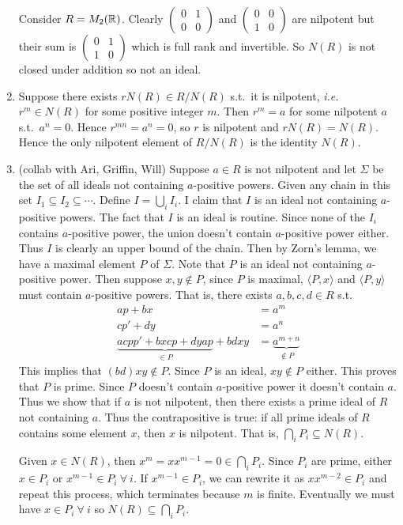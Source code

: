 \documentclass[12pt]{article}
\begin{document}
\begin{problem}[2]
\begin{enumerate}[label=(\alph*)]
	Consider $ R = M_2(\mathbb{R})$. Clearly $ \begin{pmatrix} 0&1\\0&0 \end{pmatrix} $ and $ \begin{pmatrix} 0&0\\1&0 \end{pmatrix} $ are nilpotent but their sum is $ \begin{pmatrix} 0&1\\1&0 \end{pmatrix} $ which is full rank and invertible. So $ N(R)$ is not closed under addition so not an ideal.
\item Suppose there exists $ rN(R) \in R /N(R)$ s.t.\ it is nilpotent,  \emph{i.e.} $ r^{m} \in N(R)$ for some positive integer $ m$. Then $ r^{m} = a$ for some nilpotent $ a$  s.t.\ $ a^{n}=0$. Hence $ r^{mn} = a^{n} = 0$, so $ r$ is nilpotent and  $ rN(R) = N(R)$. Hence the only nilpotent element of  $ R /N(R)$ is the identity  $ N(R)$.
\item (collab with Ari, Griffin, Will) Suppose $ a \in R$ is not nilpotent and let $ \Sigma$ be the set of all ideals not containing $ a$-positive powers. Given any chain in this set $ I_1 \subseteq I_2 \subseteq \cdots$. Define $ I = \bigcup_{ i} I_i$. I claim that $ I$ is an ideal not containing  $ a$-positive powers. The fact that $ I$ is an ideal is routine. Since none of the  $ I_i$ contains $ a$-positive power, the union doesn't contain  $ a$-positive power either. Thus  $ I$ is clearly an upper bound of the chain. Then by Zorn's lemma, we have a maximal element $ P$ of $ \Sigma$. Note that $ P$ is an ideal not containing $ a$-positive power. Then suppose  $ x,y \not\in P$, since $ P$ is maximal,  $ \langle P,x \rangle$ and $ \langle P,y \rangle$ must contain $ a$-positive powers. That is, there exists  $ a,b,c,d \in R$ s.t.\ 
	\begin{align*}
		ap+bx &= a^{m}\\
		cp'+dy &= a^{n} \\
		\underbrace{ acpp'+bxcp+dyap}_{ \in P} + bdxy &= \underbrace{ a^{m+n} }_{ \not\in P} 
	\end{align*}
	This implies that $ (bd)xy \not\in P$. Since $ P$ is an ideal,  $xy \not\in P $ either. This proves that $ P$ is prime. Since $ P$ doesn't contain  $ a$-positive power it doesn't contain  $ a$. Thus we show that if $ a$ is not nilpotent, then there exists a prime ideal of $ R$ not containing $ a$. Thus the contrapositive is true: if all prime ideals of $ R$ contains some element $ x$, then  $ x$ is nilpotent. That is,  $ \bigcap_{ i} P_i \subseteq N(R) $.

	Given $ x \in N(R)$, then $ x^{m}= x x^{m-1} = 0 \in \bigcap_{ i} P_i$. Since $ P_i$ are prime, either  $ x \in P_i$ or $ x^{m-1} \in P_i \ \forall \ i$. If $ x^{m-1} \in P_i$, we can rewrite it as $ x x^{m-2} \in P_i$ and repeat this process, which terminates because $ m$ is finite. Eventually we must have  $ x \in P_i \ \forall \ i$ so $ N(R) \subseteq \bigcap_{ i} P_i $.

\end{enumerate}
\end{problem}
\end{document}
